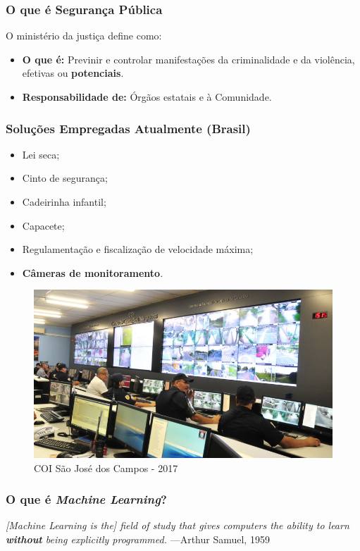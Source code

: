 \begin{frame}
	\frametitle{O que é Segurança Pública}
	O ministério da justiça\cite{seguranca-publica} define como:
	\begin{itemize}
		\item \textbf{O que é:}
		Previnir e controlar manifestações da criminalidade
		e da violência, efetivas ou \textbf{potenciais}.
		\item \textbf{Responsabilidade de:}
		Órgãos estatais e à Comunidade.
	\end{itemize}
\end{frame}

\begin{frame}
	\frametitle{Soluções Empregadas Atualmente (Brasil)}
	\begin{itemize}[<+->]
		\item Lei seca;
		\item Cinto de segurança;
		\item Cadeirinha infantil;
		\item Capacete;
		\item Regulamentação e fiscalização de velocidade
		máxima;
		\item \textbf{Câmeras de monitoramento}.
 	\end{itemize}
\end{frame}

\begin{frame}
	\begin{figure}[h]
		\caption{COI São José dos Campos - 2017}
		\centering
		\includegraphics[width=1\textwidth]{imagens/coi}
	\end{figure}
\end{frame}

\begin{frame}
	\frametitle{O que é \textit{Machine Learning}?}
	\textit{[Machine  Learning  is  the]  field  of  study  that  gives  computers  the  ability  to  learn
	\textbf{without} being explicitly programmed.}
	—Arthur Samuel, 1959
\end{frame}

